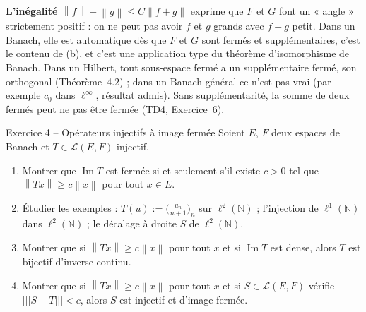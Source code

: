 \documentclass[11pt,a4paper]{article}
\newcommand{\N}{\mathbb{N}}
\newcommand{\norm}[1]{\left\|#1\right\|}
\newcommand{\opnorm}[1]{|\!|\!|#1|\!|\!|}
\newcommand{\Lc}{\mathcal{L}}
\DeclareMathOperator{\Ima}{Im}
\theoremstyle{definition}
\begin{document}
\begin{pointcle}
\textbf{L'inégalité $\norm f+\norm g\le C\norm{f+g}$} exprime que $F$ et $G$ font un « angle » strictement positif : on ne peut pas avoir $f$ et $g$ grands avec $f+g$ petit. Dans un Banach, elle est automatique dès que $F$ et $G$ sont fermés et supplémentaires, c'est le contenu de (b), et c'est une application type du théorème d'isomorphisme de Banach. Dans un Hilbert, tout sous-espace fermé a un supplémentaire fermé, son orthogonal (Théorème~4.2) ; dans un Banach général ce n'est pas vrai (par exemple $c_0$ dans $\ell^\infty$, résultat admis). Sans supplémentarité, la somme de deux fermés peut ne pas être fermée (TD4, Exercice~6).
\end{pointcle}

\begin{exo}{Exercice 4 -- Opérateurs injectifs à image fermée}
Soient $E$, $F$ deux espaces de Banach et $T\in\Lc(E,F)$ injectif.
\begin{enumerate}[label=(\alph*)]
  \item Montrer que $\Ima T$ est fermée si et seulement s'il existe $c>0$ tel que $\norm{Tx}\ge c\norm x$ pour tout $x\in E$.
  \item Étudier les exemples : $T(u):=\big(\frac{u_n}{n+1}\big)_n$ sur $\ell^2(\N)$ ; l'injection de $\ell^1(\N)$ dans $\ell^2(\N)$ ; le décalage à droite $S$ de $\ell^2(\N)$.
  \item Montrer que si $\norm{Tx}\ge c\norm x$ pour tout $x$ et si $\Ima T$ est dense, alors $T$ est bijectif d'inverse continu.
  \item Montrer que si $\norm{Tx}\ge c\norm x$ pour tout $x$ et si $S\in\Lc(E,F)$ vérifie $\opnorm{S-T}<c$, alors $S$ est injectif et d'image fermée.
\end{enumerate}
\end{exo}
\end{document}
